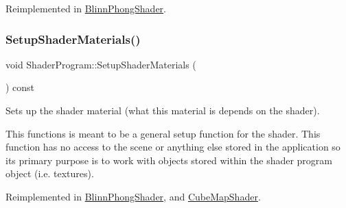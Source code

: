 Reimplemented in \hyperlink{class_blinn_phong_shader_a812ffd751068ae3bfc131ddb27712941}{Blinn\+Phong\+Shader}.

\hypertarget{class_shader_program_a20ea5669f122fa6143e7fa8ee9d92578}{}\label{class_shader_program_a20ea5669f122fa6143e7fa8ee9d92578}
\subsubsection{\texorpdfstring{Setup\+Shader\+Materials()}{SetupShaderMaterials()}}
{\footnotesize\ttfamily void Shader\+Program\+::\+Setup\+Shader\+Materials (\begin{DoxyParamCaption}{ }\end{DoxyParamCaption}) const\hspace{0.3cm}{\ttfamily [virtual]}}



Sets up the shader material (what this material is depends on the shader).

This functions is meant to be a general setup function for the shader. This function has no access to the scene or anything else stored in the application so its primary purpose is to work with objects stored within the shader program object (i.\+e. textures).

Reimplemented in \hyperlink{class_blinn_phong_shader_a444db9ffe3d55dbbb55ced8cf4abb705}{Blinn\+Phong\+Shader}, and \hyperlink{class_cube_map_shader_a9deaf42646258af9237751f331fb215a}{Cube\+Map\+Shader}.

\hypertarget{class_shader_program_aac2a462281a872df0ed8d197ec0b4104}{}\label{class_shader_program_aac2a462281a872df0ed8d197ec0b4104}
